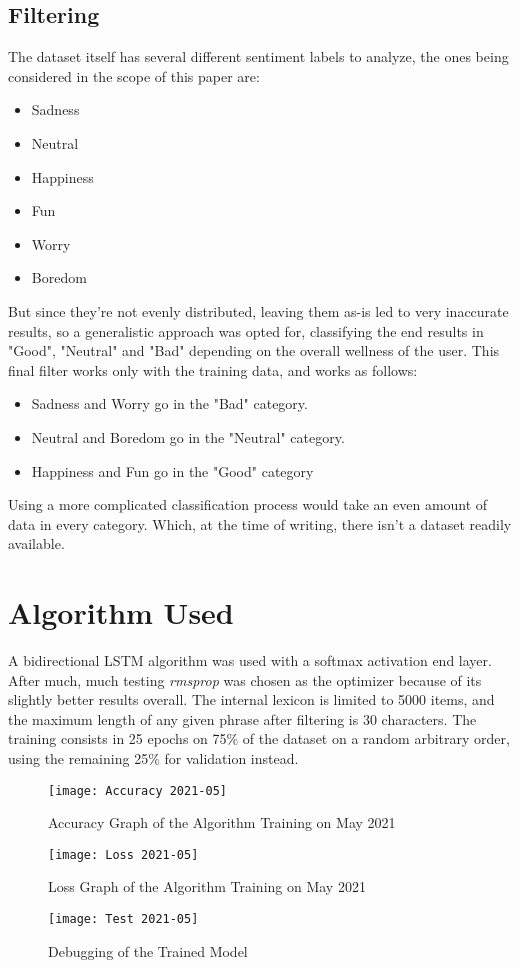 \subsection{Filtering}
The dataset itself has several different sentiment labels to analyze, the ones being considered in the scope of this paper are:
\begin{itemize}
	\item Sadness
	\item Neutral
	\item Happiness
	\item Fun
	\item Worry
	\item Boredom
\end{itemize}
But since they're not evenly distributed, leaving them as-is led to very inaccurate results, so a generalistic approach was opted for, classifying the end results in "Good", "Neutral" and "Bad" depending on the overall wellness of the user.
This final filter works only with the training data, and works as follows:
\begin{itemize}
	\item Sadness and Worry go in the "Bad" category.
	\item Neutral and Boredom go in the "Neutral" category.
	\item Happiness and Fun go in the "Good" category
\end{itemize}
Using a more complicated classification process would take an even amount of data in every category. Which, at the time of writing, there isn't a dataset readily available.

\section{Algorithm Used}
A bidirectional LSTM algorithm was used with a softmax activation end layer. After much, much testing \textit{rmsprop} was chosen as the optimizer because of its slightly better results overall.
The internal lexicon is limited to 5000 items, and the maximum length of any given phrase after filtering is 30 characters.
The training consists in 25 epochs on 75\% of the dataset on a random arbitrary order, using the remaining 25\% for validation instead.
\begin{figure}[!h]
	\centering
	\texttt{[image: Accuracy 2021-05]}
	\caption{Accuracy Graph of the Algorithm Training on May 2021}
	\label{fig:accuracy2021}
	\texttt{[image: Loss 2021-05]}
	\caption{Loss Graph of the Algorithm Training on May 2021}
	\label{fig:loss2021}
\end{figure}
\begin{figure}[!h]
	\centering
	\texttt{[image: Test 2021-05]}
	\caption{Debugging of the Trained Model}
	\label{fig:test}
\end{figure}
\pagebreak


